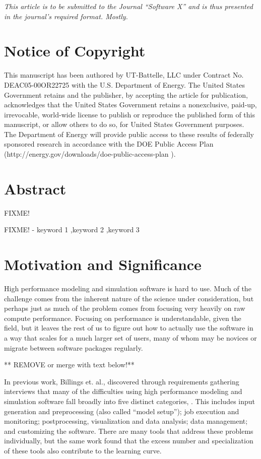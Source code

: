 \emph{This article is to be submitted to the Journal ``Software X'' and
is thus presented in the journal's required format. Mostly.}

\section{Notice of Copyright}\label{notice-of-copyright}

This manuscript has been authored by UT-Battelle, LLC under Contract No.
DEAC05-00OR22725 with the U.S. Department of Energy. The United States
Government retains and the publisher, by accepting the article for
publication, acknowledges that the United States Government retains a
nonexclusive, paid-up, irrevocable, world-wide license to publish or
reproduce the published form of this manuscript, or allow others to do
so, for United States Government purposes. The Department of Energy will
provide public access to these results of federally sponsored research
in accordance with the DOE Public Access Plan
(http://energy.gov/downloads/doe-public-access-plan ).

\section{Abstract}\label{abstract}

FIXME!

FIXME! - keyword 1 ,keyword 2 ,keyword 3

\section{Motivation and Significance}\label{motivation-and-significance}

High performance modeling and simulation software is hard to use. Much
of the challenge comes from the inherent nature of the science under
consideration, but perhaps just as much of the problem comes from
focusing very heavily on raw compute performance. Focusing on
performance is understandable, given the field, but it leaves the rest
of us to figure out how to actually use the software in a way that
scales for a much larger set of users, many of whom may be novices or
migrate between software packages regularly.

** REMOVE or merge with text below!**

In previous work, Billings et. al., discovered through requirements
gathering interviews that many of the difficulties using high
performance modeling and simulation software fall broadly into five
distinct categories, \cite{billings_cbhpc}. This includes input
generation and preprocessing (also called ``model setup''); job
execution and monitoring; postprocessing, visualization and data
analysis; data management; and customizing the software. There are many
tools that address these problems individually, but the same work found
that the excess number and specialization of these tools also contribute
to the learning curve.

